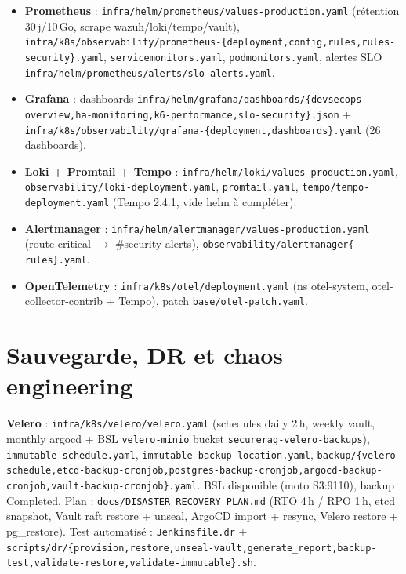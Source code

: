 \documentclass[12pt,a4paper,openany]{report}
\begin{document}
\begin{itemize}
  \item \textbf{Prometheus} : \texttt{infra/helm/prometheus/values-production.yaml}
  (rétention 30\,j/10\,Go, scrape wazuh/loki/tempo/vault),
  \texttt{infra/k8s/observability/prometheus-\{deployment,config,rules,rules-security\}.yaml},
  \texttt{servicemonitors.yaml}, \texttt{podmonitors.yaml},
  alertes SLO \texttt{infra/helm/prometheus/alerts/slo-alerts.yaml}.
  \item \textbf{Grafana} : dashboards \texttt{infra/helm/grafana/dashboards/\{devsecops-overview,ha-monitoring,k6-performance,slo-security\}.json}
  + \texttt{infra/k8s/observability/grafana-\{deployment,dashboards\}.yaml} (26 dashboards).
  \item \textbf{Loki + Promtail + Tempo} : \texttt{infra/helm/loki/values-production.yaml},
  \texttt{observability/loki-deployment.yaml}, \texttt{promtail.yaml},
  \texttt{tempo/tempo-deployment.yaml} (Tempo 2.4.1, vide helm à compléter).
  \item \textbf{Alertmanager} : \texttt{infra/helm/alertmanager/values-production.yaml}
  (route critical $\rightarrow$ \#security-alerts), \texttt{observability/alertmanager\{-rules\}.yaml}.
  \item \textbf{OpenTelemetry} : \texttt{infra/k8s/otel/deployment.yaml} (ns otel-system,
  otel-collector-contrib + Tempo), patch \texttt{base/otel-patch.yaml}.
\end{itemize}

\section{Sauvegarde, DR et chaos engineering}

\textbf{Velero} : \texttt{infra/k8s/velero/velero.yaml} (schedules daily 2\,h, weekly vault,
monthly argocd + BSL \texttt{velero-minio} bucket \texttt{securerag-velero-backups}),
\texttt{immutable-schedule.yaml}, \texttt{immutable-backup-location.yaml},
\texttt{backup/\{velero-schedule,etcd-backup-cronjob,postgres-backup-cronjob,argocd-backup-cronjob,vault-backup-cronjob\}.yaml}.
BSL disponible (moto S3:9110), backup Completed.
Plan : \texttt{docs/DISASTER\_RECOVERY\_PLAN.md} (RTO 4\,h / RPO 1\,h, etcd snapshot,
Vault raft restore + unseal, ArgoCD import + resync, Velero restore + pg\_restore).
Test automatisé : \texttt{Jenkinsfile.dr} + \texttt{scripts/dr/\{provision,restore,unseal-vault,generate\_report,backup-test,validate-restore,validate-immutable\}.sh}.
\end{document}
